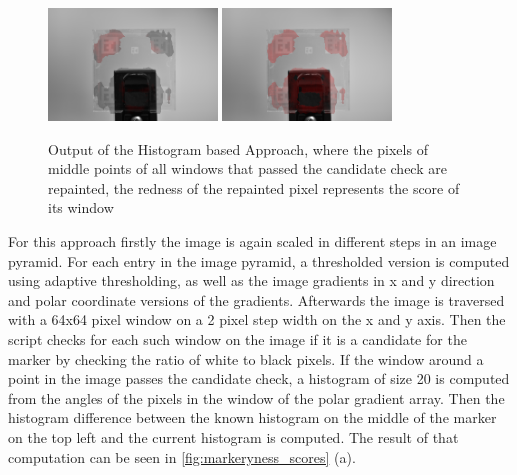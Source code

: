 \documentclass[10pt]{book}
\begin{document}
\begin{figure}
  \centering
     {\includegraphics[width=0.4\textwidth]{image/classic_hist_markerynesses}}
     {\includegraphics[width=0.4\textwidth]{image/classic_markeryness}}
  \caption{Output of the Histogram based Approach, where the pixels of middle points of all windows that passed the candidate check are repainted, the redness of the repainted pixel represents the score of its window}
  \label{fig:markeryness_scores}
\end{figure}

For this approach firstly the image is again scaled in different steps in an image pyramid. For each entry in the image pyramid, a thresholded version is computed using adaptive thresholding, as well as the image gradients in x and y direction and polar coordinate versions of the gradients. Afterwards the image is traversed with a 64x64 pixel window on a 2 pixel step width on the x and y axis. Then the script checks for each such window on the image if it is a candidate for the marker by checking the ratio of white to black pixels. If the window around a point in the image passes the candidate check, a histogram of size 20 is computed from the angles of the pixels in the window of the polar gradient array. Then the histogram difference between the known histogram on the middle of the marker on the top left and the current histogram is computed. The result of that computation can be seen in \autoref{fig:markeryness_scores} (a). 
\end{document}
